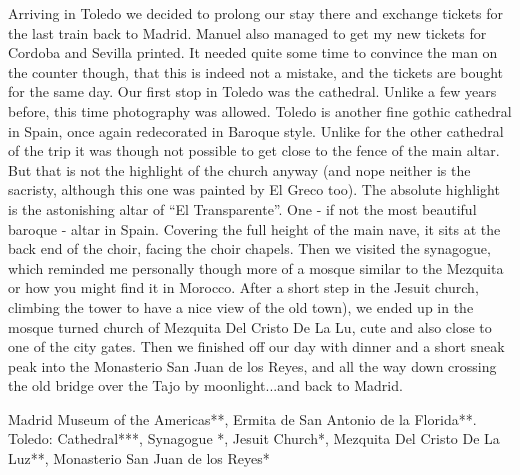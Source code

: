 Arriving in Toledo we decided to prolong our stay there and exchange tickets for the last train back to Madrid. Manuel also managed to get my new tickets for Cordoba and Sevilla printed. It needed quite some time to convince the man on the counter though, that this is indeed not a mistake, and the tickets are bought for the same day. Our first stop in Toledo was the cathedral. Unlike a few years before, this time photography was allowed. Toledo is another fine gothic cathedral in Spain, once again redecorated in Baroque style. Unlike for the other cathedral of the trip it was though not possible to get close to the fence of the main altar. But that is not the highlight of the church anyway (and nope neither is the sacristy, although this one was painted by El Greco too). The absolute highlight is the astonishing altar of ``El Transparente''. One - if not the most beautiful baroque - altar in Spain. Covering the full height of the main nave, it sits at the back end of the choir, facing the choir chapels. Then we visited the synagogue, which reminded me personally though more of a mosque similar to the Mezquita or how you might find it in Morocco. After a short step in the Jesuit church, climbing the tower to have a nice view of the old town), we ended up in the mosque turned church of Mezquita Del Cristo De La Lu, cute and also close to one of the city gates. Then we finished off our day with dinner and a short sneak peak into the Monasterio San Juan de los Reyes, and all the way down crossing the old bridge over the Tajo by moonlight...and back to Madrid.

Madrid
Museum of the Americas**,
Ermita de San Antonio de la Florida**.\\
Toledo:
Cathedral***,
Synagogue *,
Jesuit Church*,
Mezquita Del Cristo De La Luz**,
Monasterio San Juan de los Reyes*\\


